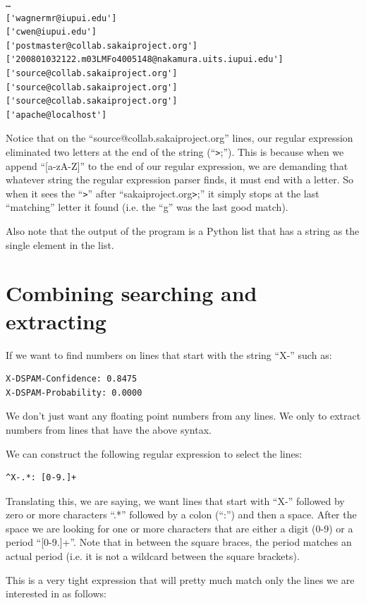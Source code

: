 \documentclass[11pt]{book}
\begin{document}
\beforeverb
\begin{verbatim}
…
['wagnermr@iupui.edu']
['cwen@iupui.edu']
['postmaster@collab.sakaiproject.org']
['200801032122.m03LMFo4005148@nakamura.uits.iupui.edu']
['source@collab.sakaiproject.org']
['source@collab.sakaiproject.org']
['source@collab.sakaiproject.org']
['apache@localhost']
\end{verbatim}
\afterverb
%
Notice that on the ``source@collab.sakaiproject.org'' lines, our regular expression eliminated two letters at the end of the string (``\verb">";'').  This is because when we append ``[a-zA-Z]'' to the end of our regular expression, we are demanding that whatever string the regular expression parser finds, it must end with a letter.   So when it sees the ``\verb">"'' after ``sakaiproject.org\verb">";'' it simply stops at the last ``matching'' letter it found (i.e. the ``g'' was the last good match).

Also note that the output of the program is a Python list that has a string as the single element in the list.

\section{Combining searching and extracting}

If we want to find numbers on lines that start with the string ``X-'' such as:

\beforeverb
\begin{verbatim}
X-DSPAM-Confidence: 0.8475
X-DSPAM-Probability: 0.0000  
\end{verbatim}
\afterverb
%
We don't just want any floating point numbers from any lines.  We only to extract numbers from lines that have the above syntax.

We can construct the following regular expression to select the lines:

\beforeverb
\begin{verbatim}
^X-.*: [0-9.]+
\end{verbatim}
\afterverb
%
Translating this, we are saying, we want lines that start with ``X-'' followed by zero or more characters ``.*'' followed by a colon (``:'') and then a space.  After the space we are looking for one or more characters that are either a digit (0-9) or a period ``[0-9.]+''.  Note that in between the square braces, the period matches an actual period (i.e. it is not a wildcard between the square brackets).

This is a very tight expression that will pretty much match only the lines we are interested in as follows:
\end{document}
